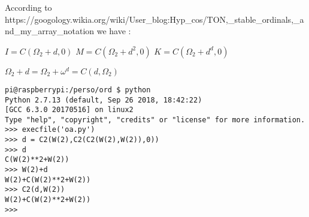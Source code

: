 \documentclass[10pt]{article}
\begin{document}
According to  https://googology.wikia.org/wiki/User\_blog:Hyp\_cos/TON,\_stable\_ordinals,\_and\_my\_array\_notation we have :

 $I = C(\Omega_2+d,0)$
 $M = C(\Omega_2+d^2,0)$
 $K = C(\Omega_2+d^d,0)$
 
$\Omega_2 + d = \Omega_2 + \omega^d = C(d,\Omega_2)$

\begin{verbatim}
pi@raspberrypi:/perso/ord $ python
Python 2.7.13 (default, Sep 26 2018, 18:42:22)
[GCC 6.3.0 20170516] on linux2
Type "help", "copyright", "credits" or "license" for more information.
>>> execfile('oa.py')
>>> d = C2(W(2),C2(C2(W(2),W(2)),0))
>>> d
C(W(2)**2+W(2))
>>> W(2)+d
W(2)+C(W(2)**2+W(2))
>>> C2(d,W(2))
W(2)+C(W(2)**2+W(2))
>>>
\end{verbatim}
\end{document}
